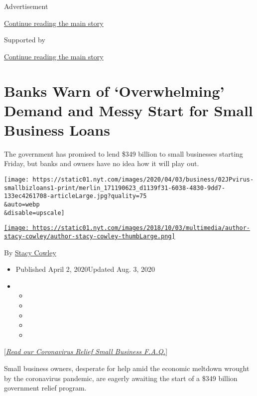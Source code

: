 Advertisement

\protect\hyperlink{after-top}{Continue reading the main story}

Supported by

\protect\hyperlink{after-sponsor}{Continue reading the main story}

\hypertarget{banks-warn-of-overwhelming-demand-and-messy-start-for-small-business-loans}{%
\section{Banks Warn of `Overwhelming' Demand and Messy Start for Small
Business
Loans}\label{banks-warn-of-overwhelming-demand-and-messy-start-for-small-business-loans}}

The government has promised to lend \$349 billion to small businesses
starting Friday, but banks and owners have no idea how it will play out.

\texttt{[image: https://static01.nyt.com/images/2020/04/03/business/02JPvirus-smallbizloans1-print/merlin\_171190623\_d1139f31-6038-4830-9dd7-133ec4261708-articleLarge.jpg?quality=75\\\&auto=webp\\\&disable=upscale]}

\href{https://www.nytimes.com/by/stacy-cowley}{\texttt{[image: https://static01.nyt.com/images/2018/10/03/multimedia/author-stacy-cowley/author-stacy-cowley-thumbLarge.png]}}

By \href{https://www.nytimes.com/by/stacy-cowley}{Stacy Cowley}

\begin{itemize}
\item
  Published April 2, 2020Updated Aug. 3, 2020
\item
  \begin{itemize}
  \item
  \item
  \item
  \item
  \item
  \end{itemize}
\end{itemize}

{[}\href{https://www.nytimes.com/article/small-business-loans-stimulus-grants-freelancers-coronavirus.html}{\emph{Read
our Coronavirus Relief Small Business F.A.Q.}}{]}

Small business owners, desperate for help amid the economic meltdown
wrought by the coronavirus pandemic, are eagerly awaiting the start of a
\$349 billion government relief program.

